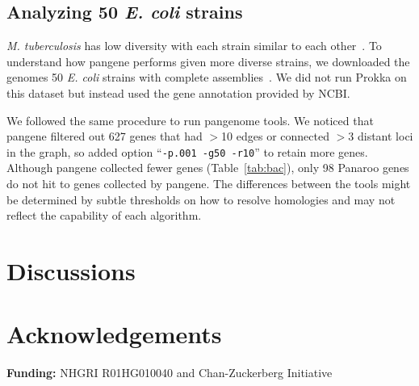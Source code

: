 \documentclass{bioinfo}
\begin{document}
\subsection*{Analyzing 50 \emph{E. coli} strains}

\emph{M. tuberculosis} has low diversity with each strain similar to each other~\citep{Marin:2022aa}.
To understand how pangene performs given more diverse strains,
we downloaded the genomes 50 \emph{E. coli} strains with complete assemblies~\citep{Shaw:2021aa}.
We did not run Prokka on this dataset but instead used the gene annotation provided by NCBI.

We followed the same procedure to run pangenome tools.
We noticed that pangene filtered out 627 genes that had $>$10 edges or connected $>$3 distant loci in the graph,
so added option ``{\tt -p.001 -g50 -r10}'' to retain more genes.
Although pangene collected fewer genes (Table~\ref{tab:bac}),
only 98 Panaroo genes do not hit to genes collected by pangene.
The differences between the tools might be determined by subtle thresholds on how to resolve homologies
and may not reflect the capability of each algorithm.

\section*{Discussions}

\section*{Acknowledgements}

{\bf Funding:} NHGRI R01HG010040 and Chan-Zuckerberg Initiative


\end{document}
